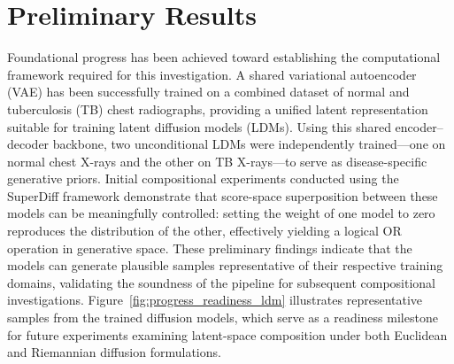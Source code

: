 \section{Preliminary Results}
\label{sec:research_method_preliminary_results}

Foundational progress has been achieved toward establishing the computational framework required for this investigation.  
A shared variational autoencoder (VAE) has been successfully trained on a combined dataset of normal and tuberculosis (TB) chest radiographs, providing a unified latent representation suitable for training latent diffusion models (LDMs).  
Using this shared encoder–decoder backbone, two unconditional LDMs were independently trained—one on normal chest X-rays and the other on TB X-rays—to serve as disease-specific generative priors.  
Initial compositional experiments conducted using the SuperDiff framework demonstrate that score-space superposition between these models can be meaningfully controlled: setting the weight of one model to zero reproduces the distribution of the other, effectively yielding a logical OR operation in generative space.  
These preliminary findings indicate that the models can generate plausible samples representative of their respective training domains, validating the soundness of the pipeline for subsequent compositional investigations.  
Figure~\ref{fig:progress_readiness_ldm} illustrates representative samples from the trained diffusion models, which serve as a readiness milestone for future experiments examining latent-space composition under both Euclidean and Riemannian diffusion formulations.

